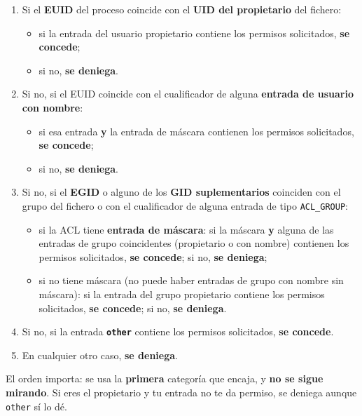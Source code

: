 \documentclass[11pt,a4paper]{report}
\begin{document}
\begin{enumerate}
  \item Si el \textbf{EUID} del proceso coincide con el \textbf{UID del propietario} del fichero:
    \begin{itemize}
      \item si la entrada del usuario propietario contiene los permisos solicitados, \textbf{se concede};
      \item si no, \textbf{se deniega}.
    \end{itemize}
  \item Si no, si el EUID coincide con el cualificador de alguna \textbf{entrada de usuario con nombre}:
    \begin{itemize}
      \item si esa entrada \textbf{y} la entrada de máscara contienen los permisos solicitados, \textbf{se concede};
      \item si no, \textbf{se deniega}.
    \end{itemize}
  \item Si no, si el \textbf{EGID} o alguno de los \textbf{GID suplementarios} coinciden con el grupo del fichero o con el cualificador de alguna entrada de tipo \texttt{ACL\_GROUP}:
    \begin{itemize}
      \item si la ACL tiene \textbf{entrada de máscara}: si la máscara \textbf{y} alguna de las entradas de grupo coincidentes (propietario o con nombre) contienen los permisos solicitados, \textbf{se concede}; si no, \textbf{se deniega};
      \item si no tiene máscara (no puede haber entradas de grupo con nombre sin máscara): si la entrada del grupo propietario contiene los permisos solicitados, \textbf{se concede}; si no, \textbf{se deniega}.
    \end{itemize}
  \item Si no, si la entrada \textbf{\texttt{other}} contiene los permisos solicitados, \textbf{se concede}.
  \item En cualquier otro caso, \textbf{se deniega}.
\end{enumerate}
 
\begin{importante}
El orden importa: se usa la \textbf{primera} categoría que encaja, y \textbf{no se sigue mirando}. Si eres el propietario y tu entrada no te da permiso, se deniega aunque \texttt{other} sí lo dé.
\end{importante}
 
\end{document}

